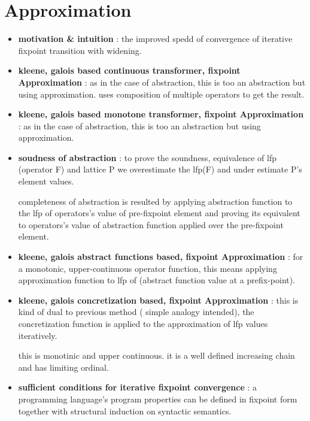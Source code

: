 \chapter{Approximation}

\begin{itemize}
	\item{\textbf{motivation \& intuition} : the improved spedd of convergence of iterative fixpoint transition with widening.
	}

	\item{\textbf{kleene, galois based continuous transformer, fixpoint Approximation} : as in the case of abstraction, this is too an abstraction but using approximation. uses composition of multiple operators to get the result.
	}

	\item{\textbf{kleene, galois based monotone transformer, fixpoint Approximation} : as in the case of abstraction, this is too an abstraction but using approximation. 
	}

	\item{\textbf{soudness of abstraction} : to prove the soundness, equivalence of lfp (operator F) and lattice P we overestimate the lfp(F) and under estimate P's element values.

	completeness of abstraction is resulted by applying abstraction function to the lfp of operators's value of pre-fixpoint element and proving its equivalent to operators's value of abstraction function applied over the pre-fixpoint element.
	}

	\item{\textbf{kleene, galois abstract functions based, fixpoint Approximation} : for a monotonic, upper-continuous operator function, this means applying approximation function to lfp of (abstract function value at a prefix-point).
	}

	\item{\textbf{kleene, galois concretization based, fixpoint Approximation} : this is kind of  dual to previous method ( simple analogy intended), the concretization function is applied to the approximation of lfp values iteratively. 

	this is monotinic and upper continuous. it is a well defined increasing chain and has limiting ordinal.
	}

	\item{\textbf{sufficient conditions for iterative fixpoint convergence} : a programming language's program properties can be defined in fixpoint form together with structural induction on syntactic semantics.

}
\end{itemize}
